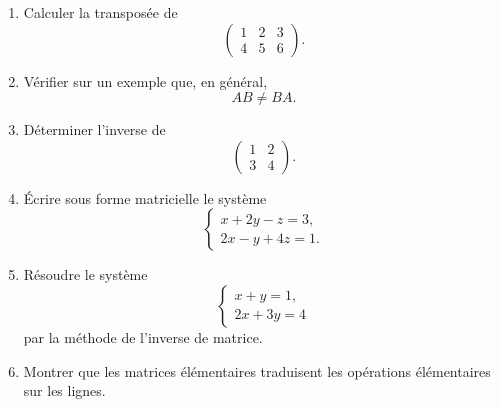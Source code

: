 \documentclass[11pt,a4paper]{article}
\theoremstyle{remark}
\begin{document}
\begin{enumerate}[label=\textbf{Exercice \arabic*.}]
    \item Calculer la transposée de
    \[
    \begin{pmatrix}
    1 & 2 & 3\\
    4 & 5 & 6
    \end{pmatrix}.
    \]

    \item Vérifier sur un exemple que, en général,
    \[
    AB\neq BA.
    \]

    \item Déterminer l’inverse de
    \[
    \begin{pmatrix}
    1 & 2\\
    3 & 4
    \end{pmatrix}.
    \]

    \item Écrire sous forme matricielle le système
    \[
    \begin{cases}
    x+2y-z=3,\\
    2x-y+4z=1.
    \end{cases}
    \]

    \item Résoudre le système
    \[
    \begin{cases}
    x+y=1,\\
    2x+3y=4
    \end{cases}
    \]
    par la méthode de l’inverse de matrice.

    \item Montrer que les matrices élémentaires traduisent les opérations élémentaires sur les lignes.
\end{enumerate}
\end{document}
